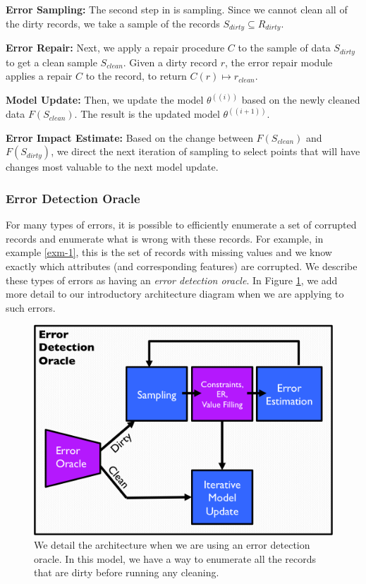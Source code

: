 \vspace{0.5em}

\noindent\textbf{Error Sampling: } The second step in \sys is sampling. Since we cannot clean all of the dirty records, we take a sample of the records $S_{dirty} \subseteq R_{dirty}$.

\vspace{0.5em}

\noindent\textbf{Error Repair: } Next, we apply a repair procedure $C$ to the sample of data $S_{dirty}$ to get a clean sample $S_{clean}$. Given a dirty record $r$, the error repair module applies a repair $C$ to the record, to return $C(r)\mapsto r_{clean}$. 

\vspace{0.5em}

\noindent\textbf{Model Update: } Then, we update the model $\theta^({(i)})$ based on the newly cleaned data $F(S_{clean})$. The result is the updated model $\theta^({(i+1)})$.

\vspace{0.5em}

\noindent\textbf{Error Impact Estimate: } Based on the change between $F(S_{clean})$ and $F(S_{dirty})$, we direct the next iteration of sampling to select points that will have changes most valuable to the next model update.

\subsubsection{Error Detection Oracle}
For many types of errors, it is possible to efficiently enumerate a set of corrupted records and enumerate what is wrong with these records.
For example, in example \ref{exm-1}, this is the set of records with missing values and we know exactly which attributes (and corresponding features) are corrupted.
We describe these types of errors as having an \emph{error detection oracle}.
In Figure \ref{sys-arch4a}, we add more detail to our introductory architecture diagram when we are applying \sys to such errors.

\begin{figure}[t]
\centering
 \includegraphics[width=0.6\columnwidth]{figs/arch1a.png}
 \caption{We detail the \sys architecture when we are using an error detection oracle. In this model, we have a way to enumerate all the records that are dirty before running any cleaning. \label{sys-arch4a}}
\end{figure}

